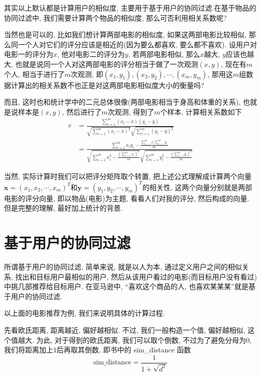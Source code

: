 \documentclass[a4paper,UTF8]{ctexart}
\theoremstyle{plain} \newtheorem{theorem}{定理}[section]
\theoremstyle{plain} \newtheorem{definition}{定义}[section]
\theoremstyle{plain} \newtheorem{lemma}{引理}[section]
\theoremstyle{plain} \newtheorem{proposition}{命题}[section]
\theoremstyle{plain} \newtheorem{example}{例}[section]
\theoremstyle{plain} \newtheorem{remark}{注}[section]
\theoremstyle{plain} \newtheorem{corollary}{推论}[section]
\begin{document}
其实以上默认都是计算用户的相似度, 主要用于基于用户的协同过滤.在基于物品的协同过滤中, 我们需要计算两个物品的相似度, 那么可否利用相关系数呢?

当然也是可以的, 比如我们想计算两部电影的相似度, 如果这两部电影比较相似, 那么同一个人对它们的评分应该是相近的(因为要么都喜欢, 要么都不喜欢). 设用户对电影一的评分为$x$, 他对电影二的评分为$y$, 若两部电影相似, 那么$x$越大, $y$应该也越大, 也就是说同一个人对这两部电影的评分相当于做了一次观测$(x,y)$, 现在有$m$个人, 相当于进行了$m$次观测, 即$(x_1,y_1),(x_2,y_2),\cdots,(x_m,y_m)$, 那用这$m$组数据计算出的相关系数不也正是对这两部电影相似度大小的衡量吗?

而且, 这时也和统计学中的二元总体很像(两部电影相当于身高和体重的关系), 也就是说样本是$(x,y)$, 然后进行了$m$次观测, 得到了$m$个样本, 计算相关系数如下
\begin{align*}
r & =  \frac{\sum\limits_{i=1}^{m}(x_{i}-\bar{x})(y_{i} - \bar{y})}{\sqrt{\sum\limits_{i=1}^{m}(x_{i} - \bar{x})^2}\sqrt{\sum\limits_{i=1}^{m}(y_{i} - \bar{y})^2}} \\ 
& = \frac{\sum\limits_{i=1}^{m}x_{i}y_{i} - \frac{\sum\limits_{i=1}^{m}x_{i}\sum\limits_{i=1}^{m}y_{i}}{m}}{\sqrt{\sum\limits_{i=1}^{m}x_{i}^{2} - \frac{\left(\sum\limits_{i=1}^{m}x_{i}\right)^{2}}{m}}\sqrt{\sum\limits_{i=1}^{m}y_{i}^{2} - \frac{\left(\sum\limits_{i=1}^{m}y_{i}\right)^{2}}{m}}}
\end{align*}

当然, 实际计算时我们可以把评分矩阵取个转置, 把上述公式理解成计算两个向量$\bm{x} = (x_1,x_2,\cdots,x_m)^{T}$和$\bm{y} = (y_1,y_2,\cdots,y_m)^{T}$的相关性, 这两个向量分别就是两部电影的评分向量, 即以物品(电影)为主题, 看看人们对我的评分, 然后构成的向量. 但是完整的理解, 最好加上统计的背景.






\section{基于用户的协同过滤}
所谓基于用户的协同过滤, 简单来说, 就是以人为本, 通过定义用户之间的相似关系, 找出和目标用户最相似的用户, 然后从该用户看过的电影(而目标用户没有看过)中挑几部推荐给目标用户. 在亚马逊中, “喜欢这个商品的人, 也喜欢某某某”就是基于用户的协同过滤.

以上面的电影推荐为例, 我们来说明具体的计算过程.

先看欧氏距离, 距离越近, 偏好越相似. 不过, 我们一般构造一个值, 偏好越相似, 这个值越大. 为此, 对于得到的欧氏距离, 我们可以取个倒数, 不过为了避免分母为$0$, 我们将距离加上$1$后再取其倒数, 即书中的 sim\_distance 函数
\begin{equation*}
\mathrm{sim\_distance} = \frac{1}{1 + \sqrt{d^2}}
\end{equation*}
\end{document}
